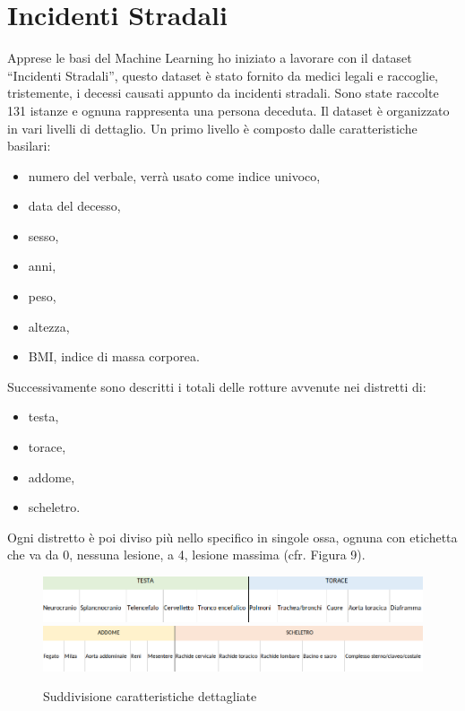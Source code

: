 \documentclass[12pt,italian]{report}
\begin{document}
\section{Incidenti Stradali}
\label{incidentiStradali}
Apprese le basi del Machine Learning ho iniziato a lavorare con il dataset ``Incidenti Stradali'', questo dataset è stato fornito da medici legali e raccoglie, tristemente, i decessi causati appunto da incidenti stradali. Sono state raccolte 131 istanze e ognuna rappresenta una persona deceduta. Il dataset è organizzato in vari livelli di dettaglio. Un primo livello è composto dalle  caratteristiche basilari:
\begin{itemize}
	\item numero del verbale, verrà usato come indice univoco,
	\item data del decesso,
	\item sesso,
	\item anni,
	\item peso,
	\item altezza,
	\item BMI, indice di massa corporea.
\end{itemize}
Successivamente sono descritti i totali delle rotture avvenute nei distretti di:
\begin{itemize}
	\item testa,
	\item torace,
	\item addome,
	\item scheletro.
\end{itemize}
Ogni distretto è poi diviso più nello specifico in singole ossa, ognuna con etichetta che va da 0, nessuna lesione, a 4, lesione massima (cfr. Figura 9).
\begin{figure}[h]
	\centering
	\includegraphics[width = \textwidth]{immagini/testa-torace-dataset}
	\includegraphics[width = \textwidth]{immagini/addome-scheletro-dataset}
	\caption{Suddivisione caratteristiche dettagliate}
\end{figure}
\end{document}
